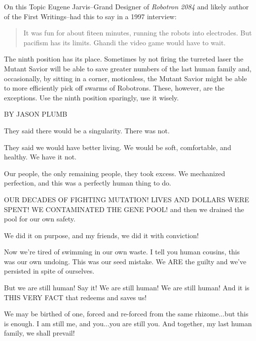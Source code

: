 \documentclass{amsbook}
\begin{document}
On this Topic Eugene Jarvis--Grand Designer of {\em Robotron 2084} and
likely author of the First Writings--had this to say in a 1997
interview:

\begin{quotation}
    It was fun for about fiteen minutes, running the robots into
    electrodes. But pacifism has its limits. Ghandi the video game
    would have to wait.
\end{quotation}

The ninth position has its place. Sometimes by not firing the turreted
laser the Mutant Savior will be able to save greater numbers of the
last human family and, occasionally, by sitting in a corner,
motionless, the Mutant Savior might be able to more efficiently pick
off swarms of Robotrons. These, however, are the exceptions. Use the
ninth position sparingly, use it wisely.

% 
% 
% 

\clearpage

{\ROBOFONTx BY JASON PLUMB}
\vskip 36pt

They said there would be a singularity.  There was not.

They said we would have better living.  We would be soft, comfortable, and healthy.  We have it not.

Our people, the only remaining people, they took excess.  We mechanized perfection, and this was a perfectly human thing to do.

OUR DECADES OF FIGHTING MUTATION!  LIVES AND DOLLARS WERE SPENT!  WE CONTAMINATED THE GENE POOL!
and then we drained the pool for our own safety.  

We did it on purpose, and my friends, we did it with conviction!

Now we're tired of swimming in our own waste.
I tell you human cousins, this was our own undoing.  This was our seed mistake.  We ARE the guilty and we've persisted in spite of ourselves.

But we are still human!  Say it!  We are still human!  We are still human!
And it is THIS VERY FACT that redeems and saves us!

We may be birthed of one, forced and re-forced from the same rhizome...but this is enough.  I am still me, and you...you are still you.  And together, my last human family, we shall prevail!
\end{document}

